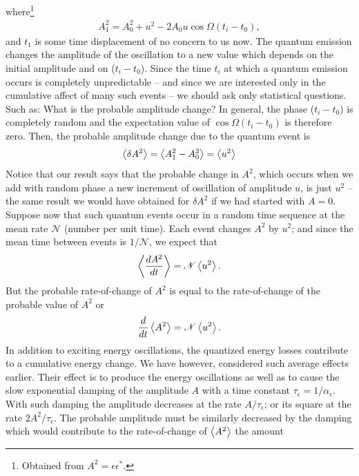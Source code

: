 where\footnote{Obtained from $A^2 = \epsilon \epsilon^*$.}
\begin{align}
	A_1^2 = A_0^2 + u^2 - 2 A_0 u \cos \Omega (t_i - t_0),
\end{align}
and $t_1$ is some time displacement of no concern to us now. The quantum emission changes the amplitude of the oscillation to a new value which depends on the initial amplitude and on ($t_i - t_0$). Since the time $t_i$ at which a quantum emission occurs is completely unpredictable -- and since we are interested only in the cumulative affect of many such events -- we should ask only statistical questions. Such as: What is the probable amplitude change? In general, the phase ($t_i - t_0$) is completely random and the expectation value of $\cos\Omega(t_i - t_0)$ is therefore zero. Then, the probable amplitude change due to the quantum event is
\begin{align}\label{eq:5.25}
	\left< \delta A^2 \right> = \left< A_1^2 - A_0^2 \right> = \left< u^2 \right>
\end{align}
Notice that our result says that the probable change in $A^2$, which occurs when we add with random phase a new increment of oscillation of amplitude $u$, is just $u^2$ -- the same result we would have obtained for $\delta A^2$ if we had started with $A = 0$.\\
Suppose now that such quantum events occur in a random time sequence at the mean rate $\mathscr{N}$ (number per unit time). Each event changes $A^2$ by $u^2$; and since the mean time between events is $1/\mathscr{N}$, we expect that
\begin{align}\label{eq:5.26}
	\left< \dfrac{dA^2}{dt} \right> = \mathscr{N} \left< u^2 \right>.
\end{align}
But the probable rate-of-change of $A^2$ is equal to the rate-of-change of the probable value of $A^2$ or
\begin{align} \label{eq:5.27}
	\dfrac{d}{dt}\left< A^2 \right> = \mathscr{N} \left< u^2 \right>.
\end{align}
In addition to exciting energy oscillations, the quantized energy losses contribute to a cumulative energy change. We have however, considered such average effects earlier. Their effect is to produce the energy oscillations as well as to cause the slow exponential damping of the amplitude $A$ with a time constant $\tau_\epsilon= 1/\alpha_\epsilon$. With such damping the amplitude decreases at the rate $A/\tau_\epsilon$; or its square at the rate $2A^2/\tau_\epsilon$. The probable amplitude must be similarly decreased by the damping which would contribute to the rate-of-change of $\left< A^2 \right>$ the amount
